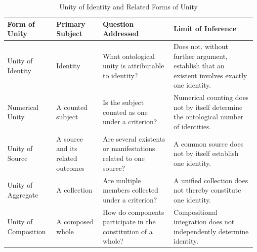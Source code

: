 %
%
%
%

\begin{table}[htbp]
\centering
\small
\renewcommand{\arraystretch}{1.4}
\setlength{\tabcolsep}{4pt}

\caption{Unity of Identity and Related Forms of Unity}
\label{tab:unity-of-identity-and-related-forms-of-unity}

\begin{tabular}{|>{\raggedright\arraybackslash}p{2.8cm}|>{\raggedright\arraybackslash}p{3.3cm}|>{\raggedright\arraybackslash}p{3.5cm}|>{\raggedright\arraybackslash}p{4.5cm}|}
\hline
\textbf{Form of Unity} &
\textbf{Primary Subject} &
\textbf{Question Addressed} &
\textbf{Limit of Inference}
\\
\hline

Unity of Identity &
Identity &
What ontological unity is attributable to identity? &
Does not, without further argument, establish that an existent involves exactly one identity.
\\
\hline

Numerical Unity &
A counted subject &
Is the subject counted as one under a criterion? &
Numerical counting does not by itself determine the ontological number of identities.
\\
\hline

Unity of Source &
A source and its related outcomes &
Are several existents or manifestations related to one source? &
A common source does not by itself establish one identity.
\\
\hline

Unity of Aggregate &
A collection &
Are multiple members collected under a criterion? &
A unified collection does not thereby constitute one identity.
\\
\hline

Unity of Composition &
A composed whole &
How do components participate in the constitution of a whole? &
Compositional integration does not independently determine identity.
\\
\hline


\end{tabular}
\end{table}
